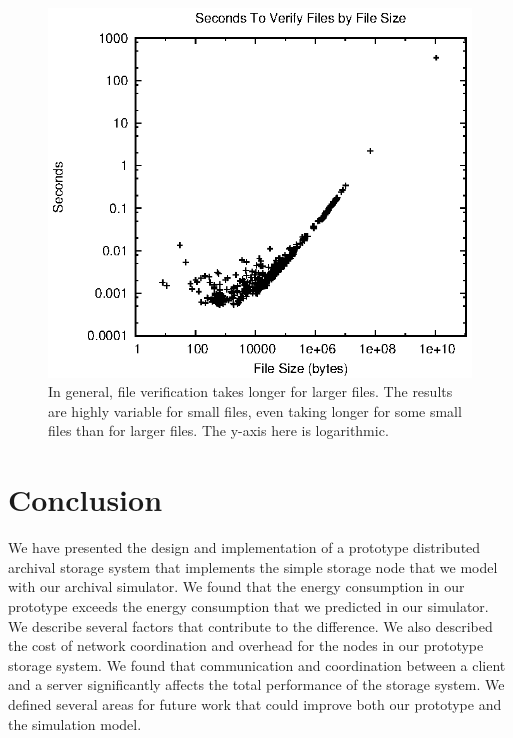 \begin{figure}[!t]
\includegraphics[width=\linewidth]{fig8.eps}
\caption{In general, file verification takes longer for larger files.  The results are highly variable for small files, even taking longer for some small files than for larger files.  The y-axis here is logarithmic.}
\label{fig8}
\end{figure}

\section{Conclusion}
We have presented the design and implementation of a prototype distributed archival storage system that implements the simple storage node that we model with our archival simulator.  We found that the energy consumption in our prototype exceeds the energy consumption that we predicted in our simulator.  We describe several factors that contribute to the difference.  We also described the cost of network coordination and overhead for the nodes in our prototype storage system.  We found that communication and coordination between a client and a server significantly affects the total performance of the storage system.  We defined several areas for future work that could improve both our prototype and the simulation model.
